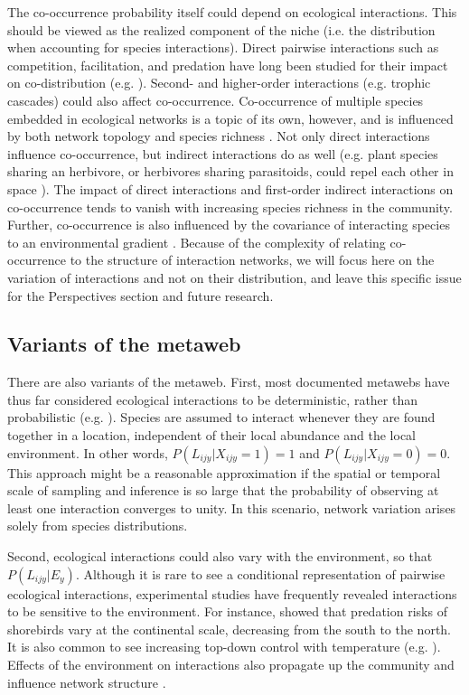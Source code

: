 \documentclass[12pt]{article}
\begin{document}
The co-occurrence probability itself could depend on ecological interactions.
This should be viewed as the realized component of the niche (i.e. the
distribution when accounting for species interactions). Direct pairwise
interactions such as competition, facilitation, and predation have long been
studied for their impact on co-distribution (e.g. \citealt{Diamond1975,
Connor1979, Gotelli2000}). Second- and higher-order interactions (e.g. trophic
cascades) could also affect co-occurrence. Co-occurrence of multiple species
embedded in ecological networks is a topic of its own, however, and is
influenced by both network topology and species richness \citep{Cazelles2016}.
Not only direct interactions influence co-occurrence, but indirect
interactions do as well (e.g. plant species sharing an herbivore, or
herbivores sharing parasitoids, could repel each other in space
\citealt{Holt1993}). The impact of direct interactions and first-order
indirect interactions on co-occurrence tends to vanish with increasing species
richness in the community. Further, co-occurrence is also influenced by the
covariance of interacting species to an environmental gradient
\citep{Cazelles2015}. Because of the complexity of relating co-occurrence to
the structure of interaction networks, we will focus here on the variation of
interactions and not on their distribution, and leave this specific issue for
the Perspectives section and future research.

\subsection*{Variants of the metaweb}

There are also variants of the metaweb. First, most documented metawebs have
thus far considered ecological interactions to be deterministic, rather than
probabilistic (e.g. \citealt{Havens1992, Wood2015}). Species are assumed to
interact whenever they are found together in a location, independent of their
local abundance and the local environment. In other words,
$P(L_{ijy}|X_{ijy}=1) = 1$ and $P(L_{ijy}|X_{ijy}=0) = 0$. This approach might
be a reasonable approximation if the spatial or temporal scale of sampling and
inference is so large that the probability of observing at least one
interaction converges to unity. In this scenario, network variation arises
solely from species distributions.

Second, ecological interactions could also vary with the environment, so that
$P(L_{ijy} |E_y)$. Although it is rare to see a conditional representation of
pairwise ecological interactions, experimental studies have frequently
revealed interactions to be sensitive to the environment. For instance,
\citep{Mckinnon2010} showed that predation risks of shorebirds vary at the
continental scale, decreasing from the south to the north. It is also common
to see increasing top-down control with temperature (e.g. \citealt{Shurin2012,
Gray2016}). Effects of the environment on interactions also propagate up the
community and influence network structure \citep{Tylianakis2007, Woodward2010,
Petchey2010a}.
\end{document}
